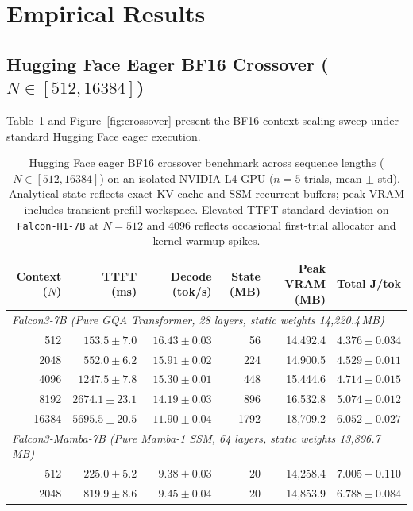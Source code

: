 \documentclass[10pt,a4paper]{article}
\begin{document}
\section{Empirical Results}

\subsection{Hugging Face Eager BF16 Crossover (\texorpdfstring{$N \in [512, 16384]$}{N in [512, 16384]})}
Table~\ref{tab:crossover} and Figure~\ref{fig:crossover} present the BF16 context-scaling sweep under standard Hugging Face eager execution.

\begin{table}[ht!]
\centering
\footnotesize
\setlength{\tabcolsep}{7.5pt}
\caption{Hugging Face eager BF16 crossover benchmark across sequence lengths ($N \in [512, 16384]$) on an isolated NVIDIA L4 GPU ($n=5$ trials, mean $\pm$ std). Analytical state reflects exact KV cache and SSM recurrent buffers; peak VRAM includes transient prefill workspace. Elevated TTFT standard deviation on \texttt{Falcon-H1-7B} at $N=512$ and $4096$ reflects occasional first-trial allocator and kernel warmup spikes.}
\label{tab:crossover}
\begin{tabular}{rrrrrr}
\toprule
\textbf{Context ($N$)} & \textbf{TTFT (ms)} & \textbf{Decode (tok/s)} & \textbf{State (MB)} & \textbf{Peak VRAM (MB)} & \textbf{Total J/tok} \\
\midrule
\multicolumn{6}{l}{\textit{Falcon3-7B (Pure GQA Transformer, 28 layers, static weights 14,220.4\,MB)}} \\
512   & $153.5 \pm 7.0$   & $16.43 \pm 0.03$ & 56   & 14,492.4 & $4.376 \pm 0.034$ \\
2048  & $552.0 \pm 6.2$   & $15.91 \pm 0.02$ & 224  & 14,900.5 & $4.529 \pm 0.011$ \\
4096  & $1247.5 \pm 7.8$  & $15.30 \pm 0.01$ & 448  & 15,444.6 & $4.714 \pm 0.015$ \\
8192  & $2674.1 \pm 23.1$ & $14.19 \pm 0.03$ & 896  & 16,532.8 & $5.074 \pm 0.012$ \\
16384 & $5695.5 \pm 20.5$ & $11.90 \pm 0.04$ & 1792 & 18,709.2 & $6.052 \pm 0.027$ \\
\midrule
\multicolumn{6}{l}{\textit{Falcon3-Mamba-7B (Pure Mamba-1 SSM, 64 layers, static weights 13,896.7\,MB)}} \\
512   & $225.0 \pm 5.2$    & $9.38 \pm 0.03$ & 20 & 14,258.4 & $7.005 \pm 0.110$ \\
2048  & $819.9 \pm 8.6$    & $9.45 \pm 0.04$ & 20 & 14,853.9 & $6.788 \pm 0.084$ \\

\end{tabular}
\end{table}
\end{document}
